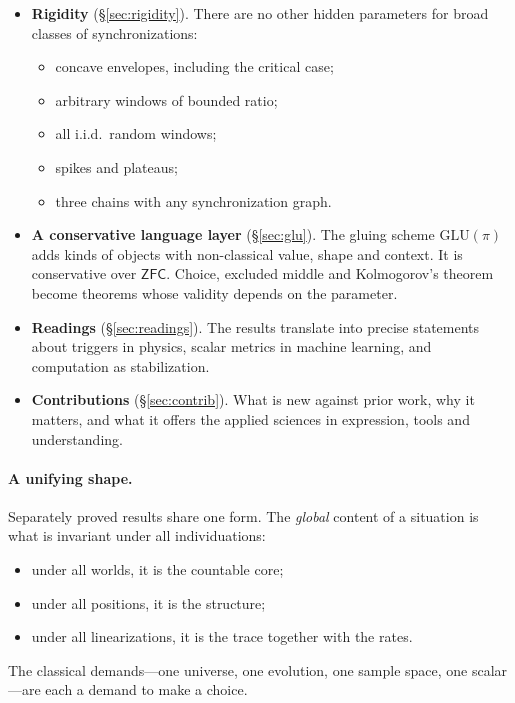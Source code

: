 \documentclass[11pt]{article}
\theoremstyle{definition}
\theoremstyle{remark}
\newcommand{\ZFC}{\mathsf{ZFC}}
\newcommand{\GLU}{\mathrm{GLU}}
\begin{document}
\begin{itemize}
\begin{itemize}
  \item The cost of hiding a failure equals the number of residual behaviours.
  \item Facts see structure, not position; linear time is an index of individuation.
  \item De Finetti and Bell are two ends of one theorem.
  \item The hidden global parameters of partially exchangeable processes are exactly asymptotic rates, present iff synchronization is scale-free.
  \end{itemize}
\item \textbf{Rigidity} (\S\ref{sec:rigidity}). There are no other hidden parameters for broad classes of synchronizations:
  \begin{itemize}
  \item concave envelopes, including the critical case;
  \item arbitrary windows of bounded ratio;
  \item all i.i.d.\ random windows;
  \item spikes and plateaus;
  \item three chains with any synchronization graph.
  \end{itemize}
\item \textbf{A conservative language layer} (\S\ref{sec:glu}). The gluing scheme $\GLU(\pi)$ adds kinds of objects with non-classical value, shape and context. It is conservative over $\ZFC$. Choice, excluded middle and Kolmogorov's theorem become theorems whose validity depends on the parameter.
\item \textbf{Readings} (\S\ref{sec:readings}). The results translate into precise statements about triggers in physics, scalar metrics in machine learning, and computation as stabilization.
\item \textbf{Contributions} (\S\ref{sec:contrib}). What is new against prior work, why it matters, and what it offers the applied sciences in expression, tools and understanding.
\end{itemize}

\paragraph{A unifying shape.} Separately proved results share one form. The \emph{global} content of a situation is what is invariant under all individuations:
\begin{itemize}
\item under all worlds, it is the countable core;
\item under all positions, it is the structure;
\item under all linearizations, it is the trace together with the rates.
\end{itemize}
The classical demands---one universe, one evolution, one sample space, one scalar---are each a demand to make a choice.
\end{document}
